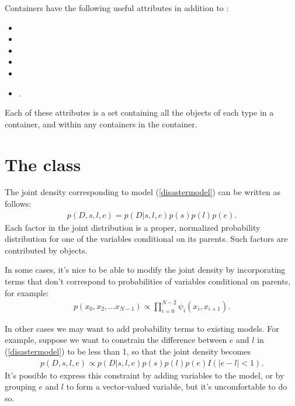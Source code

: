 Containers have the following useful attributes in addition to :
\begin{itemize}
    \item{}
    \item{}
    \item{}
    \item{}
    \item{}
    \item{}.
\end{itemize}
Each of these attributes is a set containing all the objects of each type in a container, and within any containers in the container.


\hypertarget{potential}{}
\section[The Potential class]{The  class} \label{potential}


The joint density corresponding to model (\ref{disastermodel}) can be written as follows:
\begin{eqnarray*}
    p(D,s,l,e) = p(D|s,l,e) p(s) p(l) p(e).
\end{eqnarray*}
Each factor in the joint distribution is a proper, normalized probability distribution for one of the variables conditional on its parents. Such factors are contributed by  objects.

In some cases, it's nice to be able to modify the joint density by incorporating terms that don't correspond to probabilities of variables conditional on parents, for example:
\begin{eqnarray*}
    p(x_0, x_2, \ldots x_{N-1}) \propto \prod_{i=0}^{N-2} \psi_i(x_i, x_{i+1}).
\end{eqnarray*}


In other cases we may want to add probability terms to existing models. For example, suppose we want to constrain the difference between $e$ and $l$ in (\ref{disastermodel}) to be less than 1, so that the joint density becomes
\begin{eqnarray*}
    p(D,s,l,e) \propto p(D|s,l,e) p(s) p(l) p(e) I(|e-l|<1).
\end{eqnarray*}
It's possible to express this constraint by adding variables to the model, or by grouping $e$ and $l$ to form a vector-valued variable, but it's uncomfortable to do so.

